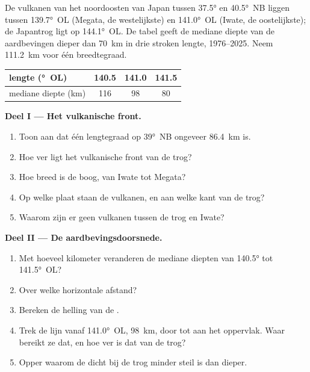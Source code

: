 \begin{problem}
\label{pb:g12:subduction-magmatism:1}
De vulkanen van het noordoosten van Japan tussen \ang{37.5} en \ang{40.5}~NB liggen
tussen \ang{139.7}~OL (Megata, de westelijkste) en \ang{141.0}~OL (Iwate, de
oostelijkste); de Japantrog ligt op \ang{144.1}~OL. De tabel geeft de
mediane diepte van de aardbevingen dieper dan \qty{70}{km} in drie stroken
lengte, 1976--2025. Neem \qty{111.2}{km} voor één breedtegraad.

\begin{center}
\small
\begin{tabular}{|l|c|c|c|}
\hline
lengte (\unit{\degree}~OL) & 140.5 & 141.0 & 141.5 \\ \hline
mediane diepte (\unit{km}) & 116 & 98 & 80 \\ \hline
\end{tabular}
\end{center}

\medskip
\noindent\textbf{Deel I --- Het vulkanische front.}
\begin{enumerate}
  \item Toon aan dat één lengtegraad op \ang{39}~NB ongeveer
        \qty{86.4}{km} is.
  \item Hoe ver ligt het vulkanische front van de trog?
  \item Hoe breed is de boog, van Iwate tot Megata?
  \item Op welke plaat staan de vulkanen, en aan welke kant van de
        trog?
  \item Waarom zijn er geen vulkanen tussen de trog en Iwate?
\end{enumerate}

\medskip
\noindent\textbf{Deel II --- De aardbevingsdoorsnede.}
\begin{enumerate}[resume]
  \item Met hoeveel kilometer veranderen de mediane diepten van
        \ang{140.5} tot \ang{141.5}~OL?
  \item Over welke horizontale afstand?
  \item Bereken de helling van de .
  \item Trek de lijn vanaf \ang{141.0}~OL, \qty{98}{km}, door tot aan het
        oppervlak. Waar bereikt ze dat, en hoe ver is dat van de trog?
  \item Opper waarom de  dicht bij de trog minder steil is dan dieper.
\end{enumerate}


\end{problem}

